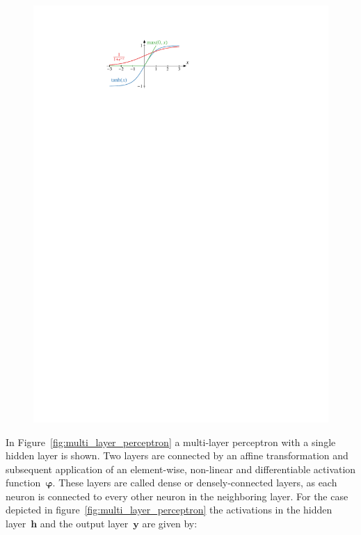 \begin{figure}[htb]
\begin{minipage}[t]{0.4\textwidth}
    \includegraphics{./figures/theory/activation_functions.pdf}
    \label{fig:activation_functions}
  \end{minipage}
\end{figure}
In Figure~\ref{fig:multi_layer_perceptron} a multi-layer perceptron with a
single hidden layer is shown. Two layers are connected by an affine
transformation and subsequent application of an element-wise, non-linear and
differentiable activation function~$\bm{\varphi}$. These layers are called dense
or densely-connected layers, as each neuron is connected to every other neuron
in the neighboring layer. For the case depicted in
figure~\ref{fig:multi_layer_perceptron} the activations in the hidden
layer~$\mathbf{h}$ and the output layer~$\mathbf{y}$ are given by:
